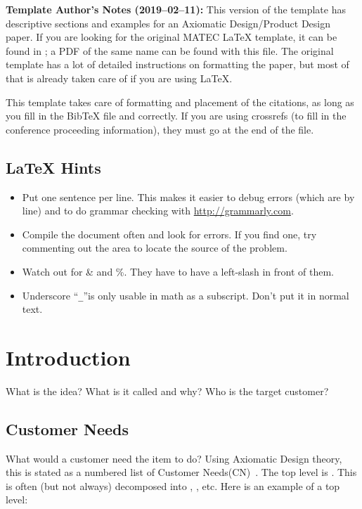 \documentclass[a4paper]{jpconf}
\begin{document}
\textbf{Template Author's Notes (2019--02--11):}
  This version of the template has descriptive sections and examples for an Axiomatic Design/Product Design paper.
  If you are looking for the original MATEC LaTeX template, it can be found in ; a PDF of the same name can be found with this file.
  The original template has a lot of detailed instructions on formatting the paper, but most of that is already taken care of if you are using LaTeX.

  This template takes care of formatting and placement of the citations, as long as you fill in the BibTeX file  and  correctly.
  If you are using crossrefs (to fill in the conference proceeding information), they must go at the end of the  file.

\subsection*{\LaTeX{} Hints}
\begin{itemize}
\item Put one sentence per line.
  This makes it easier to debug errors (which are by line) and to do grammar checking with \url{http://grammarly.com}.
\item Compile the document often and look for errors.
  If you find one, try commenting out the area to locate the source of the problem.
\item Watch out for \& and \%.  They have to have a left-slash in front of them.
\item Underscore ``\verb|_|''is only usable in math as a subscript.
  Don't put it in normal text.
\end{itemize}

\section{Introduction}
What is the idea?  What is it called and why?
Who is the target customer?

\subsection{Customer Needs}
What would a customer need the item to do?  
Using Axiomatic Design theory, this is stated as a numbered list of Customer Needs(CN)~\cite{suh1990principles}.
The top level is .
This is often (but not always) decomposed into , , etc.
Here is an example of a top level:
\end{document}
